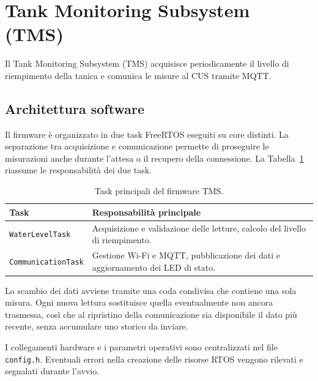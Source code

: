 \section{Tank Monitoring Subsystem (TMS)}%
\label{sec:tms}

Il Tank Monitoring Subsystem (TMS) acquisisce periodicamente
il livello di riempimento della tanica e comunica le misure
al CUS tramite MQTT.


\subsection{Architettura software}%
\label{subsec:tms-architecture}

Il firmware è organizzato in due task FreeRTOS eseguiti
su core distinti.
La separazione tra acquisizione e comunicazione permette
di proseguire le misurazioni anche durante l'attesa
o il recupero della connessione.
La Tabella~\ref{tab:tms-tasks} riassume le responsabilità
dei due task.

\begin{table}[H]
    \centering

    \begin{tabularx}{\linewidth}{
        @{}l >{\raggedright\arraybackslash}X@{}
    }
        \toprule
        \textbf{Task} &
        \textbf{Responsabilità principale} \\
        \midrule

        \texttt{WaterLevelTask} &
        Acquisizione e validazione delle letture,
        calcolo del livello di riempimento. \\

        \texttt{CommunicationTask} &
        Gestione Wi-Fi e MQTT, pubblicazione dei dati
        e aggiornamento dei LED di stato. \\

        \bottomrule
    \end{tabularx}

    \caption{Task principali del firmware TMS.}%
    \label{tab:tms-tasks}
\end{table}

Lo scambio dei dati avviene tramite una coda condivisa
che contiene una sola misura.
Ogni nuova lettura sostituisce quella eventualmente
non ancora trasmessa, così che al ripristino della
comunicazione sia disponibile il dato più recente,
senza accumulare uno storico da inviare.

I collegamenti hardware e i parametri operativi
sono centralizzati nel file \texttt{config.h}.
Eventuali errori nella creazione delle risorse RTOS
vengono rilevati e segnalati durante l'avvio.


